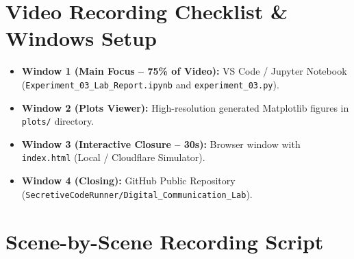 \documentclass[11pt,a4paper]{article}
\begin{document}
\noindent
{}

\vspace{0.8em}

\section*{Video Recording Checklist \& Windows Setup}
\begin{itemize}
    \item \textbf{Window 1 (Main Focus -- 75\% of Video):} VS Code / Jupyter Notebook (\texttt{Experiment\_03\_Lab\_Report.ipynb} and \texttt{experiment\_03.py}).
    \item \textbf{Window 2 (Plots Viewer):} High-resolution generated Matplotlib figures in \texttt{plots/} directory.
    \item \textbf{Window 3 (Interactive Closure -- 30s):} Browser window with \texttt{index.html} (Local / Cloudflare Simulator).
    \item \textbf{Window 4 (Closing):} GitHub Public Repository (\texttt{SecretiveCodeRunner/Digital\_Communication\_Lab}).
\end{itemize}

\vspace{0.5em}

\section{Scene-by-Scene Recording Script}
\end{document}
